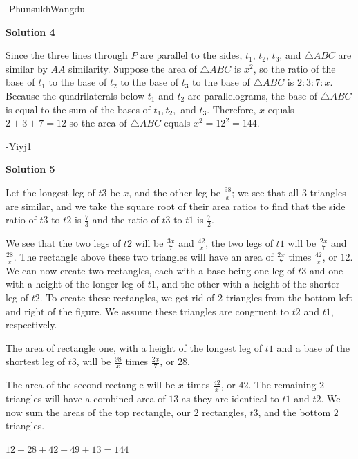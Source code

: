 \begin{enumerate}
 -PhunsukhWangdu

 


 



\textbf{Solution 4}

Since the three lines through $P$ are parallel to the sides, $t_1$, $t_2$, $t_3$, and $\triangle{ABC}$ are similar by $AA$ similarity. Suppose the area of $\triangle{ABC}$ is $x^2$, so the ratio of the base of $t_1$ to the base of $t_2$ to the base of $t_3$ to the base of $\triangle{ABC}$ is $2:3:7:x$. Because the quadrilaterals below $t_1$ and $t_2$ are parallelograms, the base of $\triangle{ABC}$ is equal to the sum of the bases of $t_1, t_2,$ and $t_3$. Therefore, $x$ equals $2+3+7=12$ so the area of $\triangle{ABC}$ equals $x^2=12^2=\boxed{144}.$

 -Yiyj1

 



\textbf{Solution 5}

Let the longest leg of $t3$ be $x$, and the other leg be $\frac{98}{x}$; we see that all $3$ triangles are similar, and we take the square root of their area ratios to find that the side ratio of $t3$ to $t2$ is $\frac{7}{3}$ and the ratio of $t3$ to $t1$ is $\frac{7}{2}$.

 We see that the two legs of $t2$ will be $\frac{3x}{7}$ and $\frac{42}{x}$, the two legs of $t1$ will be $\frac{2x}{7}$ and $\frac{28}{x}$. The rectangle above these two triangles will have an area of $\frac{2x}{7}$ times  $\frac{42}{x}$, or $12$. We can now create two rectangles, each with a base being one leg of $t3$ and one with a height of the longer leg of $t1$, and the other with a height of the shorter leg of $t2$. To create these rectangles, we get rid of 2 triangles from the bottom left and right of the figure. We assume these triangles are congruent to $t2$ and $t1$, respectively.

 The area of rectangle one, with a height of the longest leg of $t1$ and a base of the shortest leg of $t3$, will be $\frac{98}{x}$ times $\frac{2x}{7}$, or $28$. 

 The area of the second rectangle will be $x$ times $\frac{42}{x}$, or $42$. The remaining $2$ triangles will have a combined area of $13$ as they are identical to $t1$ and $t2$. We now sum the areas of the top rectangle, our $2$ rectangles, $t3$, and the bottom $2$ triangles.

 $12+28+42+49+13=\boxed{144}$




\end{enumerate}
